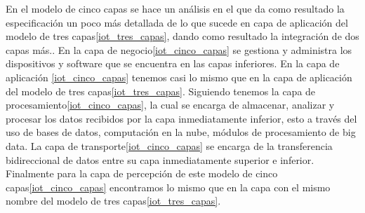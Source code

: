 \documentclass[stu,12pt,floatsintext]{apa7}
\begin{document}
	En el modelo de cinco capas se hace un análisis en el que da como resultado la especificación un poco más detallada de lo que sucede en capa de aplicación del modelo de tres capas\ref{iot_tres_capas}, dando como resultado la integración de dos capas más.. En la capa de negocio\ref{iot_cinco_capas} se gestiona y administra los dispositivos y software que se encuentra en las capas inferiores. En la capa de aplicación \ref{iot_cinco_capas} tenemos casi lo mismo que en la capa de aplicación del modelo de tres capas\ref{iot_tres_capas}. Siguiendo tenemos la capa de procesamiento\ref{iot_cinco_capas}, la cual se encarga de almacenar, analizar y procesar los datos recibidos por la capa inmediatamente inferior, esto a través del uso de bases de datos, computación en la nube, módulos de procesamiento de big data. La capa de transporte\ref{iot_cinco_capas} se encarga de la transferencia bidireccional de datos entre su capa inmediatamente superior e inferior. Finalmente para la capa de percepción de este modelo de cinco capas\ref{iot_cinco_capas} encontramos lo mismo que en la capa con el mismo nombre del modelo de tres capas\ref{iot_tres_capas}.
\end{document}
